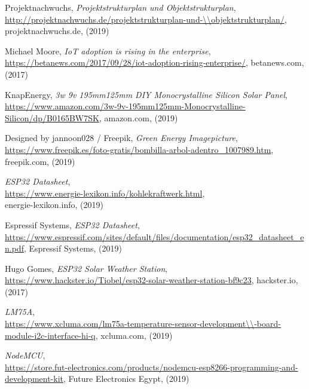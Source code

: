 
\begin{thebibliography}{99}

%
 Projektnachwuchs, 
\emph{Projektstrukturplan und Objektstrukturplan}, \\
\url{http://projektnachwuchs.de/projektstrukturplan-und-\\objektstrukturplan/}, projektnachwuchs.de, (2019)

%
 Michael Moore, 
\emph{IoT adoption is rising in the enterprise}, \\
\url{https://betanews.com/2017/09/28/iot-adoption-rising-enterprise/}, betanews.com, (2017)

%
 KnapEnergy, 
\emph{3w 9v 195mm125mm DIY Monocrystalline Silicon Solar Panel}, \\
\url{https://www.amazon.com/3w-9v-195mm125mm-Monocrystalline-Silicon/dp/B0165BW7SK}, amazon.com, (2019)

%
 Designed by jannoon028 / Freepik, 
\emph{Green Energy Imagepicture}, \\
\url{https://www.freepik.es/foto-gratis/bombilla-arbol-adentro_1007989.htm}, freepik.com, (2019)

%
\emph{ESP32 Datasheet}, \\
\url{https://www.energie-lexikon.info/kohlekraftwerk.html}, \\energie-lexikon.info, (2019)

%
 Espressif Systems, 
\emph{ESP32 Datasheet}, \\
\url{https://www.espressif.com/sites/default/files/documentation/esp32_datasheet_en.pdf}, Espressif Systems, (2019)

%
 Hugo Gomes, 
\emph{ESP32 Solar Weather Station}, \\
\url{https://www.hackster.io/Tiobel/esp32-solar-weather-station-bf9c23}, hackster.io, (2017)

%
\emph{LM75A}, \\
\url{https://www.xcluma.com/lm75a-temperature-sensor-development\\-board-module-i2c-interface-hi-q},  xcluma.com, (2019)

%
\emph{NodeMCU}, \\
\url{https://store.fut-electronics.com/products/nodemcu-esp8266-programming-and-development-kit}, Future Electronics Egypt, (2019)


\end{thebibliography}
